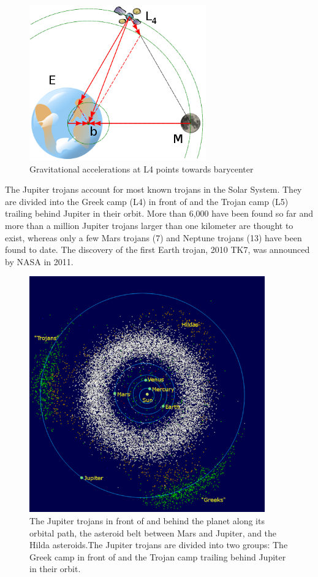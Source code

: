 \documentclass[12pt,a4paper]{article}
\begin{document}
\begin{figure}[H]
\centering
\includegraphics[width=3in]{403px-L4_diagram.png}
\caption{Gravitational accelerations at L4 points towards barycenter}
\end{figure}

The Jupiter trojans account for most known trojans in the Solar System. They are divided into the Greek camp (L4) in front of and the Trojan camp (L5) trailing behind Jupiter in their orbit. More than 6,000 have been found so far and more than a million Jupiter trojans larger than one kilometer are thought to exist, whereas only a few Mars trojans (7) and Neptune trojans (13) have been found to date. The discovery of the first Earth trojan, 2010 TK7, was announced by NASA in 2011.

\begin{figure}[H]
\centering
\includegraphics[width=4in]{600px-InnerSolarSystem-en.png}
\caption{The Jupiter trojans in front of and behind the planet along its orbital path, the asteroid belt between Mars and Jupiter, and the Hilda asteroids.The Jupiter trojans are divided into two groups: The Greek camp in front of and the Trojan camp trailing behind Jupiter in their orbit.}
\end{figure}
\end{document}
